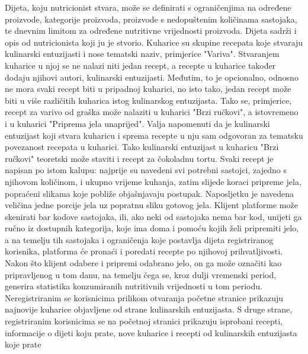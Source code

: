 	Dijeta, koju nutricionist stvara, može se definirati s ograničenjima na određene proizvode, kategorije proizvoda, proizvode s nedopuštenim količinama sastojaka, te dnevnim limitom za određene nutritivne vrijednosti proizvoda. Dijeta sadrži i opis od nutricionista koji ju je stvorio.
	Kuharice su skupine recepata koje stvaraju kulinarski entuzijasti i nose tematski naziv, primjerice "Variva". Stvaranjem kuharice u njoj se ne nalazi niti jedan recept, a recepte u kuharice također dodaju njihovi autori, kulinarski entuzijasti. Međutim, to je opcionalno, odnosno ne mora svaki recept biti u pripadnoj kuharici, no isto tako, jedan recept može biti u više različitih kuharica istog kulinarskog entuzijasta. Tako se, primjerice, recept za varivo od graška može nalaziti u kuharici "Brzi ručkovi", a istovremeno i u kuharici "Priprema jela unaprijed". Valja napomenuti da je kulinarski entuzijast koji stvara kuharicu i sprema recepte u nju sam odgovoran za tematsku povezanost recepata u kuharici. Tako kulinarski entuzijast u kuharicu "Brzi ručkovi" teoretski može staviti i recept za čokoladnu tortu.
	Svaki recept je napisan po istom kalupu: najprije su navedeni svi potrebni sastojci, zajedno s njihovom količinom, i ukupno vrijeme kuhanja, zatim slijede koraci pripreme jela, popraćeni slikama koje pobliže objašnjavaju postupak. Naposljetku je navedena veličina jedne porcije jela uz popratnu sliku gotovog jela.
	Klijent platforme može skenirati bar kodove sastojaka, ili, ako neki od sastojaka nema bar kod, unijeti ga ručno iz dostupnih kategorija, koje ima doma i pomoću kojih želi pripremiti jelo, a na temelju tih sastojaka i ograničenja koje postavlja dijeta registriranog korisnika, platforma će pronaći i poredati recepte po njihovoj prihvatljivosti. Nakon što klijent odabere i pripremi odabrano jelo, on ga može označiti kao pripravljenog u tom danu, na temelju čega se, kroz dulji vremenski period, generira statistika konzumiranih nutritivnih vrijednosti u tom periodu.
	Neregistriranim se korisnicima prilikom otvaranja početne stranice prikazuju najnovije kuharice objavljene od strane kulinarskih entuzijasta. S druge strane,  registriranim korisnicima se na početnoj stranici prikazuju isprobani recepti, informacije o dijeti koju prate, nove kuharice i recepti od kulinarskih entuzijasta koje prate
	
